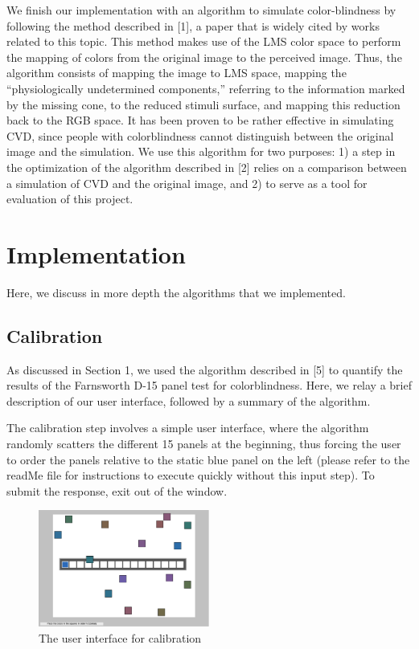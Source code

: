 \documentclass[10pt,twocolumn,letterpaper]{article}
\begin{document}
	We finish our implementation with an algorithm to simulate color-blindness by following the method described in [1], a paper that is widely cited by works related to this topic. This method makes use of the LMS color space to perform the mapping of colors from the original image to the perceived image. Thus, the algorithm consists of mapping the image to LMS space, mapping the “physiologically undetermined components,” referring to the information marked by the missing cone, to the reduced stimuli surface, and mapping this reduction back to the RGB space. It has been proven to be rather effective in simulating CVD, since people with colorblindness cannot distinguish between the original image and the simulation. We use this algorithm for two purposes: 1) a step in the optimization of the algorithm described in [2] relies on a comparison between a simulation of CVD and the original image, and 2) to serve as a tool for evaluation of this project. 




\section{Implementation}

Here, we discuss in more depth the algorithms that we implemented.

\subsection{Calibration}

As discussed in Section 1, we used the algorithm described in [5] to quantify the results of the Farnsworth D-15 panel test for colorblindness. Here, we relay a brief description of our user interface, followed by a summary of the algorithm.

The calibration step involves a simple user interface, where the algorithm randomly scatters the different 15 panels at the beginning, thus forcing the user to order the panels relative to the static blue panel on the left (please refer to the readMe file for instructions to execute quickly without this input step). To submit the response, exit out of the window.

\begin{figure}[h]
  \includegraphics[width=0.5\textwidth]{panel.png}
  \caption{The user interface for calibration}
  \label{fig:panel}
\end{figure}
\end{document}
